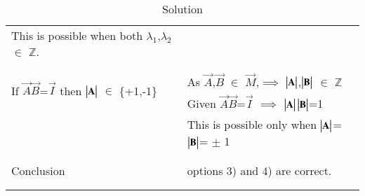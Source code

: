 \begin{longtable}{|l|l|}
	This is possible when both $\lambda_1$,$\lambda_2$ $\in$ $\mathbb{Z}$.\\
	& \\
	\hline
	\multirow{3}{*}{If $\vec{A} \vec{B}$=$\vec{I}$ then $\begin{vmatrix}\mathbf{A}\end{vmatrix}$ $\in$ \{+1,-1\}} 
	& \\
	& As $\vec{A}$,$\vec{B}$ $\in$ $\vec{M}$,$\implies$ $\begin{vmatrix}\mathbf{A}\end{vmatrix}$,$\begin{vmatrix}\mathbf{B}\end{vmatrix}$ $\in$ $\mathbb{Z}$ \\
	& Given $\vec{A}\vec{B}$=$\vec{I}$ $\implies$ $\begin{vmatrix}\mathbf{A}\end{vmatrix}\begin{vmatrix}\mathbf{B}\end{vmatrix}$=1\\
	& This is possible only when $\begin{vmatrix}\mathbf{A}\end{vmatrix}$=$\begin{vmatrix}\mathbf{B}\end{vmatrix}$= $\pm$ 1\\
	& \\
	\hline
	\multirow{3}{*}{Conclusion} & \\
	& options 3) and 4) are correct.\\
    & \\
	\hline
\caption{Solution}
\label{table:2017/dec/74/}
    \end{longtable}
